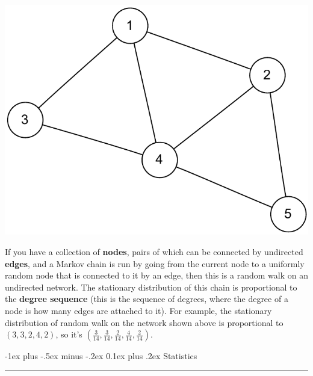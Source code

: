 \documentclass[letterpaper, 10.5pt,landscape]{article}
\makeatletter
\renewcommand{\section}{\@startsection{section}{1}{0mm}%
                                {-1ex plus -.5ex minus -.2ex}%
                                {0.1ex plus .2ex}%
                                {\normalfont\small}}
\makeatother
\begin{document}
\begin{multicols*}{3}
\begin{center}
    \begin{minipage}{0.5\linewidth}
    \includegraphics[width=\textwidth]{figures/network1.pdf}
    \end{minipage}
\end{center}




If you have a collection of \textbf{nodes}, pairs of which can be connected by undirected \textbf{edges}, and a Markov chain is run by going from the current node to a uniformly random node that is connected to it by an edge, then  this is a random walk on an undirected network. The stationary distribution of this chain is proportional to the \textbf{degree sequence} (this is the sequence of degrees, where the degree of a node is how many edges are attached to it). For example, the stationary distribution of random walk on the network shown above is proportional to $(3,3,2,4,2)$, so it's $(\frac{3}{14}, \frac{3}{14}, \frac{2}{14}, \frac{4}{14}, \frac{2}{14})$. 

\vspace*{\fill}




\pagebreak




\section{Statistics} {\color{teal}\hrule height 1pt} \smallskip


\end{multicols*}
\end{document}
